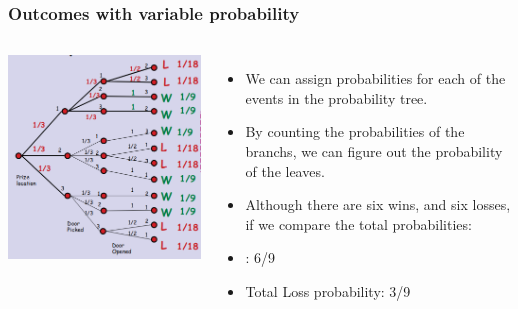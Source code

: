 \documentclass{beamer}
\begin{document}
\begin{frame}
  \frametitle{Outcomes with variable probability}

  {\large
    \begin{columns}
      \includegraphics[width=\textwidth]{../img/monty_tree_2}

    
      \begin{itemize}
      \item We can assign probabilities for each of the events in
        the probability tree.
      \item By counting the probabilities of the branchs, we can
        figure out the probability of the leaves.

        \bigskip

      \item Although there are six wins, and six losses, if we compare
        the total probabilities:
      \item {}: 6/9
      \item \alert{Total Loss probability}: 3/9
        
      \end{itemize}
    \end{columns}
  }
\end{frame}
\end{document}
